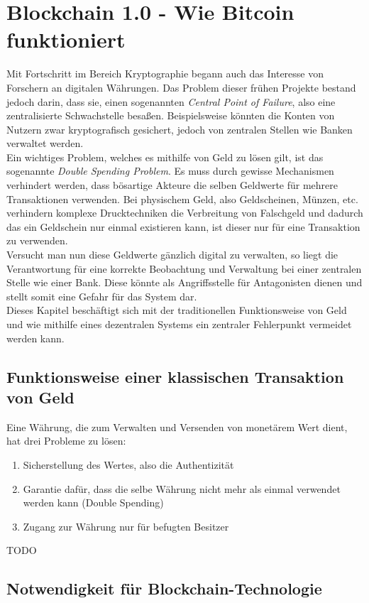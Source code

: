 \chapter{Blockchain 1.0 - Wie Bitcoin funktioniert}
Mit Fortschritt im Bereich Kryptographie begann auch das Interesse von Forschern an digitalen Währungen. 
Das Problem dieser frühen Projekte bestand jedoch darin, dass sie, einen sogenannten \emph{Central Point of Failure}, also eine zentralisierte Schwachstelle besaßen. 
Beispielsweise könnten die Konten von Nutzern zwar kryptografisch gesichert, jedoch von zentralen Stellen wie Banken verwaltet werden.\\
Ein wichtiges Problem, welches es mithilfe von Geld zu lösen gilt, ist das sogenannte \emph{Double Spending Problem}. Es muss durch gewisse Mechanismen verhindert werden, dass bösartige Akteure die selben Geldwerte für mehrere Transaktionen verwenden. Bei physischem Geld, also Geldscheinen, Münzen, etc. verhindern komplexe Drucktechniken die Verbreitung von Falschgeld und dadurch das ein Geldschein nur einmal existieren kann, ist dieser nur für eine Transaktion zu verwenden.\\
Versucht man nun diese Geldwerte gänzlich digital zu verwalten, so liegt die Verantwortung für eine korrekte Beobachtung und Verwaltung bei einer zentralen Stelle wie einer Bank. Diese könnte als Angriffsstelle für Antagonisten dienen und stellt somit eine Gefahr für das System dar.\\
Dieses Kapitel beschäftigt sich mit der traditionellen Funktionsweise von Geld und wie mithilfe eines dezentralen Systems ein zentraler Fehlerpunkt vermeidet werden kann. 
\section{Funktionsweise einer klassischen Transaktion von Geld}
Eine Währung, die zum Verwalten und Versenden von monetärem Wert dient, hat drei Probleme zu lösen:
\begin{enumerate}
	\item Sicherstellung des Wertes, also die Authentizität
	\item Garantie dafür, dass die selbe Währung nicht mehr als einmal verwendet werden kann (Double Spending)
	\item Zugang zur Währung nur für befugten Besitzer
\end{enumerate}
TODO
\section{Notwendigkeit für Blockchain-Technologie}
